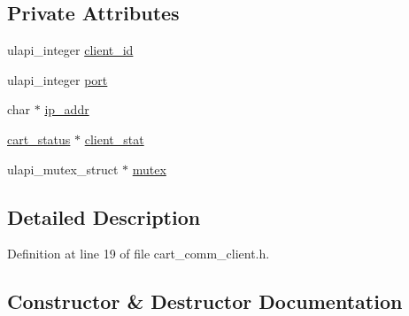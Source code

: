 \subsection*{Private Attributes}
\begin{DoxyCompactItemize}
\item 
ulapi\+\_\+integer \mbox{\hyperlink{classcart__comm__client_a40e8d8cb8282a11b418a63a777d8e975}{client\+\_\+id}}
\item 
ulapi\+\_\+integer \mbox{\hyperlink{classcart__comm__client_ab7aaa2b3805ad44d18c97a094ef705d3}{port}}
\item 
char $\ast$ \mbox{\hyperlink{classcart__comm__client_a4be5bd4f9f71038a43ec454d8370583a}{ip\+\_\+addr}}
\item 
\mbox{\hyperlink{classcart__status}{cart\+\_\+status}} $\ast$ \mbox{\hyperlink{classcart__comm__client_abaecd6fff514a7e5897f45ec7c9815c9}{client\+\_\+stat}}
\item 
ulapi\+\_\+mutex\+\_\+struct $\ast$ \mbox{\hyperlink{classcart__comm__client_a7829aa94a950b37a2d003f11761e269d}{mutex}}
\end{DoxyCompactItemize}


\subsection{Detailed Description}


Definition at line 19 of file cart\+\_\+comm\+\_\+client.\+h.



\subsection{Constructor \& Destructor Documentation}
\mbox{\label{classcart__comm__client_a23497ab5b62437e0de0d14e1ee25de84}} 
